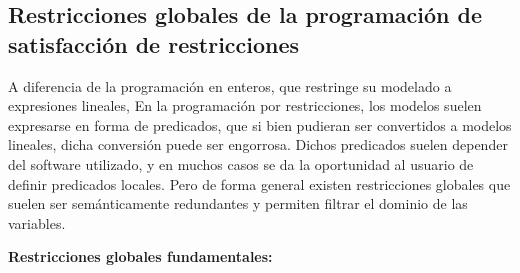 \documentclass[12pt]{report}
\begin{document}
\subsection{Restricciones globales de la programación de satisfacción de restricciones\\}

A diferencia de la programación en enteros, que restringe su modelado a expresiones lineales, En la programación por restricciones, los modelos suelen expresarse en forma de predicados, que si bien pudieran ser convertidos a modelos lineales, dicha conversión puede ser engorrosa. Dichos predicados suelen depender del software utilizado, y en muchos casos se da la oportunidad al usuario de definir predicados locales. Pero de forma general existen restricciones globales que suelen ser semánticamente redundantes y permiten filtrar el dominio de las variables.


\textbf{Restricciones globales fundamentales:}\\
\end{document}
